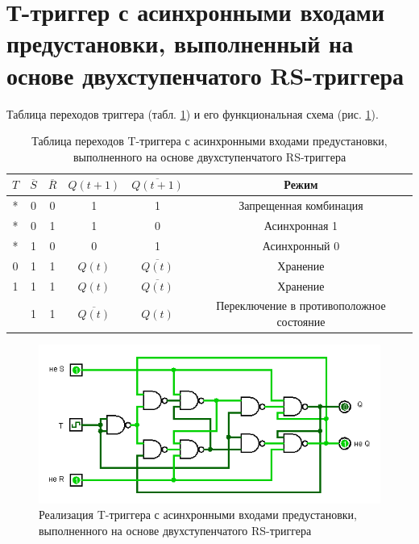 \documentclass{mirea}
\begin{document}
\clearpage	
\section{Т-триггер с асинхронными входами предустановки, выполненный на основе двухступенчатого RS-триггера}
	Таблица переходов триггера (табл. \ref{table:Ttrigger}) и его функциональная схема (рис. \ref{fig:Ttrigger}).
	
	\begin{table}[H]
		\centering
		\caption{Таблица переходов T-триггера с асинхронными входами предустановки, выполненного на основе двухступенчатого RS-триггера}
		\label{table:Ttrigger}
		\begin{tabular}{c|c|c|c|c|c}
			$ T $ & $ \overline{S} $ & $ \overline{R} $ & $ Q(t+1) $ & $ \overline{Q(t+1)} $ & Режим \\
			\hline
			* & 0 & 0 & 1 & 1 & Запрещенная комбинация \\
			\hline
			* & 0 & 1 & 1 & 0 & Асинхронная 1 \\
			\hline
			* & 1 & 0 & 0 & 1 & Асинхронный 0 \\
			\hline
			0 & 1 & 1 & $ Q(t) $ & $ \overline{Q(t)} $ & Хранение \\
			\hline
			1 & 1 & 1 & $ Q(t) $ & $ \overline{Q(t)} $ & Хранение \\
			\hline
			\texttiming{LH} & 1 & 1 & $ \overline{Q(t)} $ & $ Q(t) $ & Переключение в противоположное состояние
		\end{tabular}
	\end{table}
	
	\begin{figure}[H]
		\centering
		\includegraphics[width=\textwidth]{Ttrigger.png}
		\caption{Реализация T-триггера с асинхронными входами предустановки, выполненного на основе двухступенчатого RS-триггера}
		\label{fig:Ttrigger}
	\end{figure}
\end{document}
